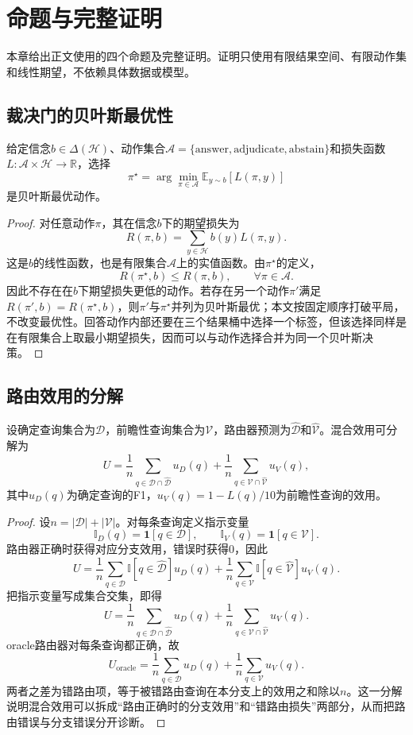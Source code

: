 \chapter{命题与完整证明}
\label{app:proofs}

本章给出正文使用的四个命题及完整证明。证明只使用有限结果空间、有限动作集和线性期望，不依赖具体数据或模型。

\section{裁决门的贝叶斯最优性}

\begin{proposition}
给定信念$b\in\Delta(\mathcal H)$、动作集合$\mathcal A=\{\text{answer},\text{adjudicate},\text{abstain}\}$和损失函数$L:\mathcal A\times\mathcal H\to\mathbb R$，选择
\[
\pi^\star=\arg\min_{\pi\in\mathcal A}\mathbb E_{y\sim b}[L(\pi,y)]
\]
是贝叶斯最优动作。
\end{proposition}

\begin{proof}
对任意动作$\pi$，其在信念$b$下的期望损失为
\[
R(\pi,b)=\sum_{y\in\mathcal H}b(y)L(\pi,y).
\]
这是$b$的线性函数，也是有限集合$\mathcal A$上的实值函数。由$\pi^\star$的定义，
\[
R(\pi^\star,b)\le R(\pi,b),\qquad \forall \pi\in\mathcal A.
\]
因此不存在在$b$下期望损失更低的动作。若存在另一个动作$\pi'$满足$R(\pi',b)=R(\pi^\star,b)$，则$\pi'$与$\pi^\star$并列为贝叶斯最优；本文按固定顺序打破平局，不改变最优性。回答动作内部还要在三个结果桶中选择一个标签，但该选择同样是在有限集合上取最小期望损失，因而可以与动作选择合并为同一个贝叶斯决策。
\end{proof}

\section{路由效用的分解}

\begin{proposition}
设确定查询集合为$\mathcal D$，前瞻性查询集合为$\mathcal V$，路由器预测为$\hat{\mathcal D}$和$\hat{\mathcal V}$。混合效用可分解为
\[
U=\frac{1}{n}\sum_{q\in\mathcal D\cap\hat{\mathcal D}}u_D(q)
+\frac{1}{n}\sum_{q\in\mathcal V\cap\hat{\mathcal V}}u_V(q),
\]
其中$u_D(q)$为确定查询的F1，$u_V(q)=1-L(q)/10$为前瞻性查询的效用。
\end{proposition}

\begin{proof}
设$n=|\mathcal D|+|\mathcal V|$。对每条查询定义指示变量
\[
\mathbb I_D(q)=\mathbf 1[q\in\mathcal D],\qquad
\mathbb I_V(q)=\mathbf 1[q\in\mathcal V].
\]
路由器正确时获得对应分支效用，错误时获得0，因此
\[
U=\frac{1}{n}\sum_{q\in\mathcal D}\mathbb I[q\in\hat{\mathcal D}]u_D(q)
+\frac{1}{n}\sum_{q\in\mathcal V}\mathbb I[q\in\hat{\mathcal V}]u_V(q).
\]
把指示变量写成集合交集，即得
\[
U=\frac{1}{n}\sum_{q\in\mathcal D\cap\hat{\mathcal D}}u_D(q)
+\frac{1}{n}\sum_{q\in\mathcal V\cap\hat{\mathcal V}}u_V(q).
\]
oracle路由器对每条查询都正确，故
\[
U_{\text{oracle}}=\frac{1}{n}\sum_{q\in\mathcal D}u_D(q)+\frac{1}{n}\sum_{q\in\mathcal V}u_V(q).
\]
两者之差为错路由项，等于被错路由查询在本分支上的效用之和除以$n$。这一分解说明混合效用可以拆成“路由正确时的分支效用”和“错路由损失”两部分，从而把路由错误与分支错误分开诊断。
\end{proof}

